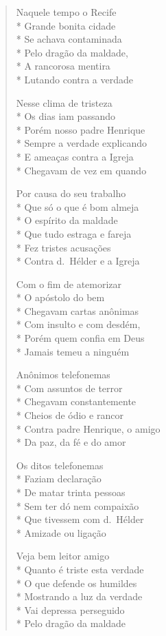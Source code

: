 \begin{verse}
Naquele tempo o Recife\\*
Grande bonita cidade\\*
Se achava contaminada\\*
Pelo dragão da maldade,\\*
A rancorosa mentira\\*
Lutando contra a verdade

Nesse clima de tristeza\\*
Os dias iam passando\\*
Porém nosso padre Henrique\\*
Sempre a verdade explicando\\*
E ameaças contra a Igreja\\*
Chegavam de vez em quando

Por causa do seu trabalho\\*
Que só o que é bom almeja\\*
O espírito da maldade\\*
Que tudo estraga e fareja\\*
Fez tristes acusações\\*
Contra d.~Hélder e a Igreja

Com o fim de atemorizar\\*
O apóstolo do bem\\*
Chegavam cartas anônimas\\*
Com insulto e com desdém,\\*
Porém quem confia em Deus\\*
Jamais temeu a ninguém

Anônimos telefonemas\\*
Com assuntos de terror\\*
Chegavam constantemente\\*
Cheios de ódio e rancor\\*
Contra padre Henrique, o amigo\\*
Da paz, da fé e do amor

Os ditos telefonemas\\*
Faziam declaração\\*
De matar trinta pessoas\\*
Sem ter dó nem compaixão\\*
Que tivessem com d.~Hélder\\*
Amizade ou ligação

Veja bem leitor amigo\\*
Quanto é triste esta verdade\\*
O que defende os humildes\\*
Mostrando a luz da verdade\\*
Vai depressa perseguido\\*
Pelo dragão da maldade


\end{verse}
